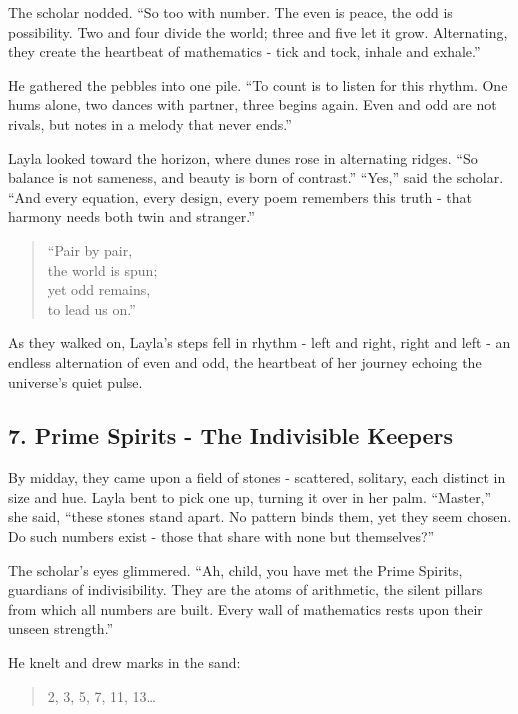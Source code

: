 \documentclass[
  letterpaper,
  DIV=11,
  numbers=noendperiod]{scrreprt}
\begin{document}
The scholar nodded. ``So too with number. The even is peace, the odd is
possibility. Two and four divide the world; three and five let it grow.
Alternating, they create the heartbeat of mathematics - tick and tock,
inhale and exhale.''

He gathered the pebbles into one pile. ``To count is to listen for this
rhythm. One hums alone, two dances with partner, three begins again.
Even and odd are not rivals, but notes in a melody that never ends.''

Layla looked toward the horizon, where dunes rose in alternating ridges.
``So balance is not sameness, and beauty is born of contrast.'' ``Yes,''
said the scholar. ``And every equation, every design, every poem
remembers this truth - that harmony needs both twin and stranger.''

\begin{quote}
``Pair by pair,\\
the world is spun;\\
yet odd remains,\\
to lead us on.''
\end{quote}

As they walked on, Layla's steps fell in rhythm - left and right, right
and left - an endless alternation of even and odd, the heartbeat of her
journey echoing the universe's quiet pulse.

\subsection{7. Prime Spirits - The Indivisible
Keepers}\label{prime-spirits---the-indivisible-keepers}

By midday, they came upon a field of stones - scattered, solitary, each
distinct in size and hue. Layla bent to pick one up, turning it over in
her palm. ``Master,'' she said, ``these stones stand apart. No pattern
binds them, yet they seem chosen. Do such numbers exist - those that
share with none but themselves?''

The scholar's eyes glimmered. ``Ah, child, you have met the Prime
Spirits, guardians of indivisibility. They are the atoms of arithmetic,
the silent pillars from which all numbers are built. Every wall of
mathematics rests upon their unseen strength.''

He knelt and drew marks in the sand:

\begin{quote}
2, 3, 5, 7, 11, 13\ldots{}
\end{quote}
\end{document}
